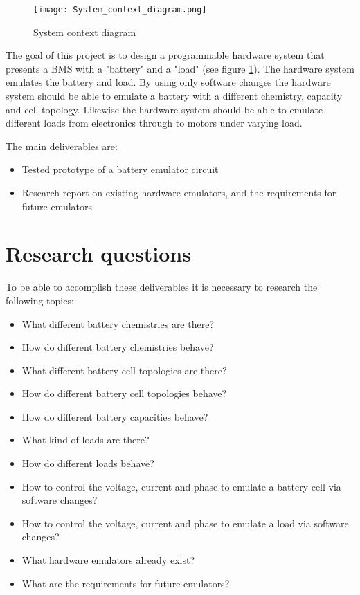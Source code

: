 \begin{figure}[ht]
    \centering
    \texttt{[image: System\_context\_diagram.png]}
    \caption{System context diagram}
    \label{fig:system_context_diagram}
\end{figure}

The goal of this project is to design a programmable hardware system that presents a BMS with a "battery" and a "load" (see figure \ref{fig:system_context_diagram}). The hardware system emulates the battery and load. By using only software changes the hardware system should be able to emulate a battery with a different chemistry, capacity and cell topology. Likewise the hardware system should be able to emulate different loads from electronics through to motors under varying load.

The main deliverables are:
\begin{itemize}
    \item Tested prototype of a battery emulator circuit
    \item Research report on existing hardware emulators, and the requirements for future emulators
\end{itemize}

\section{Research questions}
To be able to accomplish these deliverables it is necessary to research the following topics:
\begin{itemize}
    \item What different battery chemistries are there?
    \item How do different battery chemistries behave?
    \item What different battery cell topologies are there?
    \item How do different battery cell topologies behave?
    \item How do different battery capacities behave?
    \item What kind of loads are there?
    \item How do different loads behave?
    \item How to control the voltage, current and phase to emulate a battery cell via software changes?
    \item How to control the voltage, current and phase to emulate a load via software changes?
    \item What hardware emulators already exist?
    \item What are the requirements for future emulators?
\end{itemize}

